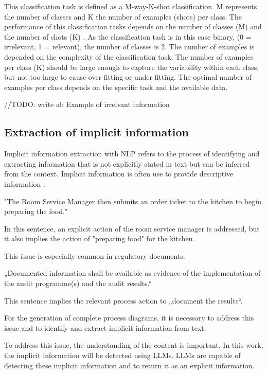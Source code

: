 This classification task is defined as a M-way-K-shot classification. M represents the number of classes and K the number of examples (shots) per class. The performance of this classification tasks depends on the number of classes (M) and the number of shots (K) \cite{parnamiLearningFewExamples2022}.  As the classification task is in this case binary, (0 = irrelevant, 1 = relevant), the number of classes is 2.  The number of examples is depended on the complexity of the classification task. The number of examples per class (K) should be large enough to capture the variability within each class, but not too large to cause over fitting or under fitting. The optimal number of examples per class depends on the specific task and the available data.

//TODO: write ab Example of irrelvant information 

\subsection{Extraction of implicit information}
Implicit information extraction with NLP refers to the process of identifying and extracting information that is not explicitly stated in text but can be inferred from the context. Implicit information is often use to provide descriptive information \cite{pereraKnowledgeDrivenImplicitInformation}.

"The Room Service Manager then submits an order ticket to the kitchen to begin preparing the food."

In this sentence, an explicit action of the room service manager is addressed, but it also implies the action of "preparing food" for the kitchen. 

This issue is especially common in regulatory documents.

„Documented information shall be available as evidence of the implementation of the audit programme(s) and the audit results.“

This sentence implies the relevant process action to „document the results“.

For the generation of complete process diagrams, it is necessary to address this issue and to identify and extract implicit information from text.

To address this issue, the understanding of the content is important. In this work, the implicit information will be detected using LLMs. LLMs are capable of detecting these implicit information and to return it as an explicit information.

